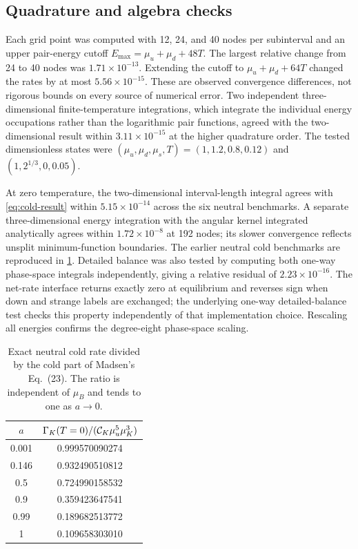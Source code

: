 \subsection{Quadrature and algebra checks}
Each grid point was computed with 12, 24, and 40 nodes per subinterval and an upper pair-energy cutoff \(E_{\max}=\mu_u+\mu_d+48T\).
The largest relative change from 24 to 40 nodes was \(1.71\times10^{-13}\).
Extending the cutoff to \(\mu_u+\mu_d+64T\) changed the rates by at most \(5.56\times10^{-15}\).
These are observed convergence differences, not rigorous bounds on every source of numerical error.
Two independent three-dimensional finite-temperature integrations, which integrate the individual energy occupations rather than the logarithmic pair functions, agreed with the two-dimensional result within \(3.11\times10^{-15}\) at the higher quadrature order.
The tested dimensionless states were \((\mu_u,\mu_d,\mu_s,T)=(1,1.2,0.8,0.12)\) and \((1,2^{1/3},0,0.05)\).

At zero temperature, the two-dimensional interval-length integral agrees with \cref{eq:cold-result} within \(5.15\times10^{-14}\) across the six neutral benchmarks.
A separate three-dimensional energy integration with the angular kernel integrated analytically agrees within \(1.72\times10^{-8}\) at 192 nodes; its slower convergence reflects unsplit minimum-function boundaries.
The earlier neutral cold benchmarks are reproduced in \cref{tab:cold-check}.
Detailed balance was also tested by computing both one-way phase-space integrals independently, giving a relative residual of \(2.23\times10^{-16}\).
The net-rate interface returns exactly zero at equilibrium and reverses sign when down and strange labels are exchanged; the underlying one-way detailed-balance test checks this property independently of that implementation choice.
Rescaling all energies confirms the degree-eight phase-space scaling.

\begin{table}[tbp]
 \centering
 \caption{Exact neutral cold rate divided by the cold part of Madsen's Eq.~(23).
 The ratio is independent of \(\mu_B\) and tends to one as \(a\to0\).}
 \label{tab:cold-check}
 \begin{tabular}{cc}
 \toprule
 \(a\) & \(\Gamma_K(T=0)/(\mathcal C_K\mu_u^5\mu_K^3)\)\\
 \midrule
 0.001 & 0.999570090274\\
 0.146 & 0.932490510812\\
 0.5   & 0.724990158532\\
 0.9   & 0.359423647541\\
 0.99  & 0.189682513772\\
 1     & 0.109658303010\\
 \bottomrule
 \end{tabular}
\end{table}

